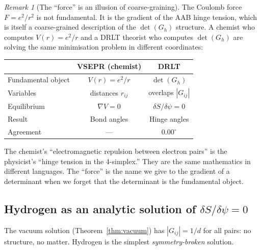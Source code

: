 \documentclass[12pt]{article}
\theoremstyle{remark}
\newtheorem{remark}[theorem]{Remark}
\theoremstyle{definition}
\begin{document}
\begin{remark}[The ``force'' is an illusion of coarse-graining]
The Coulomb force $F = e^2/r^2$ is not fundamental.  It is the gradient of the AAB hinge tension, which is itself a coarse-grained description of the $\det(G_h)$ structure.  A chemist who computes $V(r) = e^2/r$ and a DRLT theorist who computes $\det(G_h)$ are solving the same minimisation problem in different coordinates:
\begin{center}
\begin{tabular}{lcc}
\hline
& VSEPR (chemist) & DRLT \\
\hline
Fundamental object & $V(r) = e^2/r$ & $\det(G_h)$ \\
Variables & distances $r_{ij}$ & overlaps $|G_{ij}|$ \\
Equilibrium & $\nabla V = 0$ & $\delta S / \delta\psi = 0$ \\
Result & Bond angles & Hinge angles \\
Agreement & --- & $0.00^\circ$ \\
\hline
\end{tabular}
\end{center}
The chemist's ``electromagnetic repulsion between electron pairs'' is the physicist's ``hinge tension in the 4-simplex.''  They are the same mathematics in different languages.  The ``force'' is the name we give to the gradient of a determinant when we forget that the determinant is the fundamental object.

\subsection{Hydrogen as an analytic solution of $\delta S/\delta\psi = 0$}
\label{sec:hydrogen_analytic}

The vacuum solution (Theorem~\ref{thm:vacuum}) has $|G_{ij}| = 1/d$ for all pairs: no structure, no matter.  Hydrogen is the simplest \emph{symmetry-broken} solution.


\end{remark}
\end{document}
